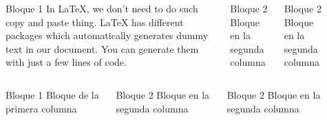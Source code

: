 \documentclass{beamer}
\title[Crypto]{}
\author{Hacking LLiure Squad}
\institute{UB}
\date{Matefest 2018}
\begin{document}
\begin{frame}
  \begin{columns}[t]
  
  \begin{column}{.05\linewidth}
  \end{column}

  \begin{column}{.30\linewidth}
    \begin{block}{Bloque 1}
      In LaTeX, we don’t need to do such copy and paste thing. LaTeX has
      different packages which automatically generates dummy text in our
      document. You can generate them with just a few lines of code.
    \end{block}
  \end{column}
  
  \begin{column}{.30\linewidth}
  \begin{block}{Bloque 2}
  Bloque en la segunda columna
  \end{block}
  \end{column}
  
  \begin{column}{.30\linewidth}
  \begin{block}{Bloque 2}
  Bloque en la segunda columna
  \end{block}
  \end{column}
  
  \begin{column}{.05\linewidth}
  \end{column}

  \end{columns}
\end{frame}

\begin{frame}
  \begin{columns}[t]
  
  \begin{column}{.05\linewidth}
  \end{column}

  \begin{column}{.30\linewidth}
  \begin{block}{Bloque 1}
  Bloque de la primera columna
  \end{block}
  \end{column}
  
  \begin{column}{.30\linewidth}
  \begin{block}{Bloque 2}
  Bloque en la segunda columna
  \end{block}
  \end{column}
  
  \begin{column}{.30\linewidth}
  \begin{block}{Bloque 2}
  Bloque en la segunda columna
  \end{block}
  \end{column}
  
  \begin{column}{.05\linewidth}
  \end{column}

  \end{columns}
\end{frame}
\end{document}
